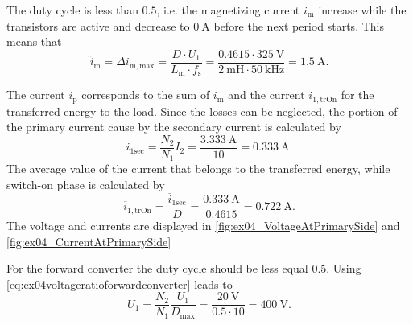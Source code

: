 \begin{solutionblock}
    The duty cycle is less than $0.5$, i.e. the magnetizing current $i_\mathrm{m}$ increase 
    while the transistors are active and decrease to $\SI{0}{\ampere}$ before the next period starts.
    This means that
    \begin{equation}
        \hat{i}_\mathrm{m}=\Delta i_\mathrm{m,max}= \frac{D \cdot U_\mathrm{1}}{L_\mathrm{m} \cdot f_\mathrm{s}} =
        \frac{0.4615 \cdot \SI{325}{\volt}}{\SI{2}{\milli\henry} \cdot \SI{50}{\kilo\hertz}} = \SI{1.5}{\ampere}.
    \end{equation}    
\end{solutionblock}


\begin{solutionblock}
    The current $i_\mathrm{p}$ corresponds to the sum of $i_\mathrm{m}$ and the current $i_\mathrm{1,trOn}$ for the transferred energy to the load.
    Since the losses can be neglected, the portion of the primary current cause by the secondary current is calculated by
    \begin{equation}
        \overline{i}_\mathrm{1sec}=\frac{N_\mathrm{2}}{N_\mathrm{1}}I_\mathrm{2}=\frac{\SI{3.333}{\ampere}}{10}=\SI{0.333}{\ampere}.
    \end{equation}    
    The average value of the current that belongs to the transferred energy, while switch-on phase is calculated by
    \begin{equation}
        \overline{i}_\mathrm{1,trOn}=\frac{\overline{i}_\mathrm{1sec}}{D}=\frac{\SI{0.333}{\ampere}}{0.4615}=\SI{0.722}{\ampere}.
    \end{equation}
    The voltage and currents are displayed in \autoref{fig:ex04_VoltageAtPrimarySide} and \autoref{fig:ex04_CurrentAtPrimarySide}
    
\end{solutionblock}
\FloatBarrier
{}
\begin{solutionblock}
    For the forward converter the duty cycle should be less equal $0.5$. Using \eqref{eq:ex04voltageratioforwardconverter} leads to
    \begin{equation}
        U_\mathrm{1}=\frac{N_\mathrm{2}}{N_\mathrm{1}}\frac{U_\mathrm{1}}{D_\mathrm{max}}=
        \frac{\SI{20}{\volt}}{0.5 \cdot 10}=\SI{400}{\volt}.
    \end{equation}
\end{solutionblock}


